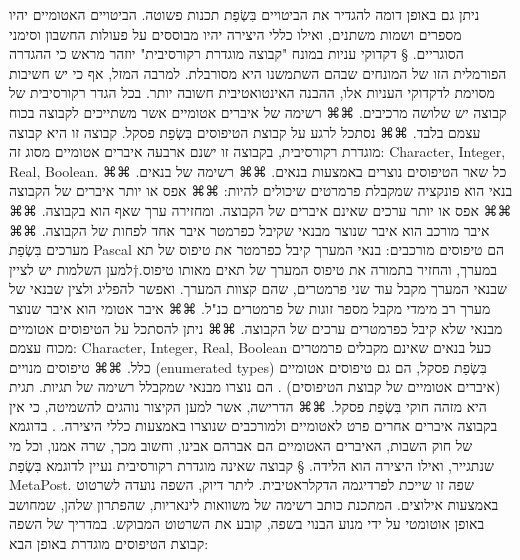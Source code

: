     
      
      
      ניתן גם באופן דומה להגדיר את הביטויים בִּשְׂפַת תכנות פשוטה. הביטויים האטומיים יהיו מספרים ושמות משתנים, ואילו כללי היצירה יהיו מבוססים על פעולות החשבון וסימני הסוגריים.
      § דקדוקי עניות במונח "קבוצה מוגדרת רקורסיבית"
      יוזהר מראש כי ההגדרה הפורמלית הזו של המונחים שבהם השתמשנו היא מסורבלת. למרבה המזל, אף כי יש חשיבות מסוימת לדקדוקי העניות אלו, ההבנה האינטואטיבית חשובה יותר.
      בכל הגדר רקורסיבית של קבוצה יש שלושה מרכיבים.
      ⌘⌘ רשימה של איברים אטומיים אשר משתייכים לקבוצה בכוח עצמם בלבד.
      ⌘⌘ נסתכל לרגע על קבוצת הטיפוסים בִּשְׂפַת פסקל. קבוצה זו היא קבוצה מוגדרת רקורסיבית, בקבוצה זו ישנם ארבעה איברים אטומיים מסוג זה: Character, Integer, Real, Boolean. כל שאר הטיפוסים נוצרים באמצעות בנאים.
      ⌘⌘ רשימה של בנאים.
      ⌘⌘ בנאי הוא פונקציה שמקבלת פרמרטים שיכולים להיות:
      ⌘⌘ אפס או יותר איברים של הקבוצה
      ⌘⌘ אפס או יותר ערכים שאינם איברים של הקבוצה.
      ומחזירה ערך שאף הוא בקבוצה.
      ⌘⌘ איבר מורכב הוא איבר שנוצר מבנאי שקיבל כפרמטר איבר אחד לפחות של הקבוצה.
      ⌘⌘ מערכים בִּשְׂפַת Pascal הם טיפוסים מורכבים: בנאי המערך קיבל כפרמטר את טיפוס של תא במערך, והחזיר בתמורה את טיפוס המערך של תאים מאותו טיפוס.†{למען השלמות יש לציין שבנאי המערך מקבל עוד שני פרמטרים, שהם קצוות המערך. ואפשר להפליג ולצין שבנאי של מערך רב מימדי מקבל מספר זוגות של פרמטרים כנ"ל.}
      ⌘⌘ איבר אטומי הוא איבר שנוצר מבנאי שלא קיבל כפרמטרים ערכים של הקבוצה.
      ⌘⌘ ניתן להסתכל על הטיפוסים אטומיים מכוח עצמם: Character, Integer, Real, Boolean כעל בנאים שאינם מקבלים פרמטרים כלל.
      ⌘⌘ טיפוסים מנויים (enumerated types) בִּשְׂפַת פסקל, הם גם טיפוסים אטומיים (איברים אטומיים של קבוצת הטיפוסים) . הם נוצרו מבנאי שמקבלל רשימה של תגיות. תגית היא מזהה חוקי בִּשְׂפַת פסקל.
      ⌘⌘ הדרישה, אשר למען הקיצור נוהגים להשמיטה, כי אין בקבוצה איברים אחרים פרט לאטומיים ולמורכבים שנוצרו באמצעות כללי היצירה. .
      בדוגמא של חוק השבות, האיברים האטומיים הם אברהם אבינו, וחשוב מכך, שרה אמנו, וכל מי שנתגייר, ואילו היצירה הוא הלידה.
      § קבוצה שאינה מוגדרת רקורסיבית
      נעיין לדוגמא בִּשְׂפַת MetaPost. שפה זו שייכת לפרדיגמה הדקלראטיבית. ליתר דיוק, השפה נועדה לשרטוט באמצעות אילוצים. המתכנת כותב רשימה של משוואות לינאריות, שהפתרון שלהן, שמחושב באופן אוטומטי על ידי מנוע הבנוי בשפה, קובע את השרטוט המבוקש.
      במדריך של השפה קבוצת הטיפוסים מוגדרת באופן הבא:
    
